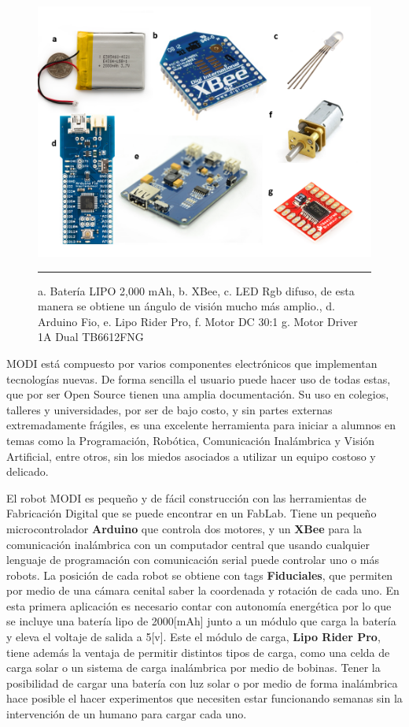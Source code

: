 \begin{figure}[htbp]
	\centering
		\includegraphics[width=\textwidth]{./Figures/MODI/compElo.png}
		\rule{35em}{0.5pt}
	\caption[Componentes Electrónicos]{a. Batería LIPO 2,000 mAh, b. XBee, c. LED Rgb difuso, de esta manera se obtiene un ángulo de visión mucho más amplio., d. Arduino Fio, e. Lipo Rider Pro, f. Motor DC 30:1 g. Motor Driver 1A Dual TB6612FNG  }
	\label{fig:ledRGB}
\end{figure}

MODI está compuesto por varios componentes electrónicos que implementan tecnologías nuevas. De forma sencilla el usuario puede hacer uso de todas estas, que por ser Open Source tienen una amplia documentación. Su uso en colegios, talleres y universidades, por ser de bajo costo, y sin partes externas extremadamente frágiles, es una excelente herramienta para iniciar a alumnos en temas como la Programación, Robótica, Comunicación Inalámbrica y Visión Artificial, entre otros, sin los miedos asociados a utilizar un equipo costoso y delicado.

El robot MODI es pequeño y de fácil construcción con las herramientas de Fabricación Digital que se puede encontrar en un FabLab. Tiene un pequeño microcontrolador \textbf{Arduino} que controla dos motores, y un \textbf{XBee} para la comunicación inalámbrica con un computador central que usando cualquier lenguaje de programación con comunicación serial puede controlar uno o más robots. La posición de cada robot se obtiene con tags \textbf{Fiduciales}, que permiten por medio de una cámara cenital saber la coordenada y rotación de cada uno. En esta primera aplicación es necesario contar con autonomía energética por lo que se incluye una batería lipo de 2000[mAh] junto a un módulo que carga la batería y eleva el voltaje de salida a 5[v]. Este el módulo de carga, \textbf{Lipo Rider Pro}, tiene además la ventaja de permitir distintos tipos de carga, como una celda de carga solar o un sistema de carga inalámbrica por medio de bobinas. Tener la posibilidad de cargar una batería con luz solar o por medio de forma inalámbrica hace posible el hacer experimentos que necesiten estar funcionando semanas sin la intervención de un humano para cargar cada uno.


